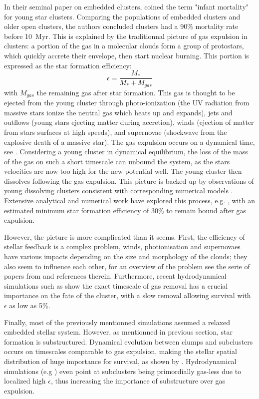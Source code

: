 In their seminal paper on embedded clusters, \cite{Lada2003} coined the term "infant mortality" for young star clusters. Comparing the populations of embedded clusters and older open clusters, the authors concluded clusters had a 90\% mortality rate before 10~Myr. This is explained by the traditionnal picture of gas expulsion in clusters: a portion of the gas in a molecular clouds form a group of protostars, which quickly accrete their envelope, then start nuclear burning. This portion is expressed as the star formation efficiency:
\begin{equation}
\epsilon = \frac{M_*}{M_* + M_{gas}}
\end{equation} 
with $M_{gas}$ the remaining gas after star formation. This gas is thought to be ejected from the young cluster through photo-ionization (the UV radiation from massive stars ionize the neutral gas which heats up and expands), jets and outflows (young stars ejecting matter during accretion), winds (ejection of matter from stars surfaces at high speeds), and supernovae (shockwave from the explosive death of a massive star). The gas expulsion occurs on a dynamical time, see \cite{Goodwin1997}. Considering a young cluster in dynamical equilibrium, the loss of the mass of the gas on such a short timescale can unbound the system, as the stars velocities are now too high for the new potential well. The young cluster then dissolves following the gas expulsion.
This picture is backed up by observations of young dissolving clusters \citep{Bastian2006} consistent with corresponding numerical models \citep{Goodwin2006}. Extensive analytical and numerical work have explored this process, e.g. \cite{Tutukov1978,Boily2003a,Boily2003b}, with an estimated minimum star formation efficiency of 30\% to remain bound after gas expulsion.

However, the picture is more complicated than it seems. First, the efficiency of stellar feedback is a complex problem, winds, photionisation and supernovaes have various impacts depending on the size and morphology of the clouds; they also seem to influence each other, for an overview of the problem see the serie of papers from \cite{Dale2011,Dale2013} and references therein. Furthermore, recent hydrodynamical simulations such as \cite{Pelupessy2012} show the exact timescale of gas removal has a crucial importance on the fate of the cluster, with a slow removal allowing survival with $\epsilon$ as low as 5\%.

Finally, most of the previously mentionned simulations assumed a relaxed embedded stellar system. However, as mentionned in previous section, star formation is substructured. Dynamical evolution between clumps and subclusters occurs on timescales comparable to gas expulsion, making the stellar spatial distribution of huge importance for survival, as shown by \cite{Farias2015}. Hydrodynamical simulations (e.g \citealt{Kruijssen2012}) even point at subclusters being primordially gas-less due to localized high $\epsilon$, thus increasing the importance of substructure over gas expulsion.


